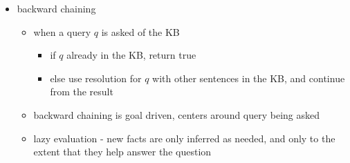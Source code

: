 \documentclass[11pt]{article}
\newcommand{\ee}[1]{\ensuremath{#1}}
\begin{document}
\begin{description}
\begin{itemize}
\begin{itemize}
		\item backward chaining
		\begin{itemize}
			\item when a query \ee{q} is asked of the KB
			\begin{itemize}
				\item if \ee{q} already in the KB, return true
				\item else use resolution for \ee{q} with other sentences in the KB, and continue from the result
			\end{itemize}
			\item backward chaining is goal driven, centers around query being asked
			\item lazy evaluation - new facts are only inferred as needed, and only to the extent that they help answer the question
		\end{itemize}
	\end{itemize}
\end{itemize}


\end{description}
\end{document}
